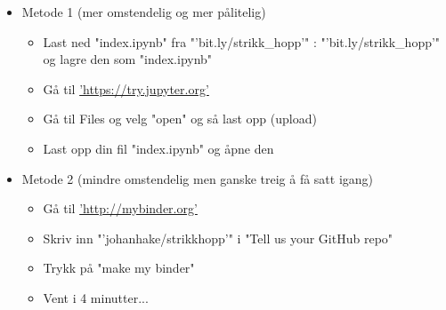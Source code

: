 \documentclass[%
oneside,                 %
final,                   %
10pt]{article}
\begin{document}
\begin{itemize}
\item Metode 1 (mer omstendelig og mer pålitelig)
\begin{itemize}

 \item Last ned "index.ipynb" fra "'bit.ly/strikk_hopp'" : "'bit.ly/strikk_hopp'" og lagre den som "index.ipynb"

 \item Gå til \href{{https://try.jupyter.org}}{'https://try.jupyter.org'}

 \item Gå til Files og velg "open" og så last opp (upload)

 \item Last opp din fil "index.ipynb" og åpne den
\end{itemize}

\noindent
\end{itemize}

\noindent

\begin{itemize}
\item Metode 2 (mindre omstendelig men ganske treig å få satt igang)
\begin{itemize}

 \item Gå til \href{{http://mybinder.org}}{'http://mybinder.org'}

 \item Skriv inn "'johanhake/strikkhopp'" i "Tell us your GitHub repo"

 \item Trykk på "make my binder"

 \item Vent i 4 minutter...
\end{itemize}

\noindent
\end{itemize}

\noindent




\end{document}
